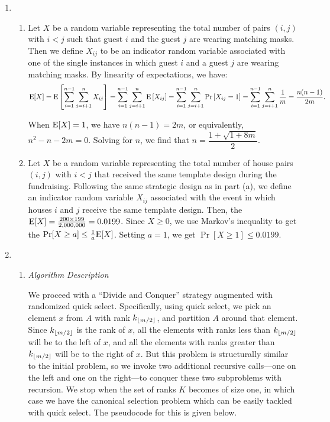 \documentclass[10pt, letterpaper]{article}
\begin{document}
\begin{enumerate}[label={\bfseries Q\arabic*.}]
  \item
    \begin{enumerate}
      \item
        Let $X$ be a random variable representing the total number of pairs $(i, j)$ with $i < j$ such
        that guest $i$ and the guest $j$ are wearing matching masks. Then we define $X_{ij}$ to be an
        indicator random variable associated with one of the single instances in which guest $i$ and a
        guest $j$ are wearing matching masks. By linearity of expectations, we have:
        \[
          \mathrm{E}[X] = \mathrm{E}\left[\displaystyle\sum_{i=1}^{n-1} \displaystyle\sum_{j=i+1}^{n} X_{ij}\right]
                = \displaystyle\sum_{i=1}^{n-1} \displaystyle\sum_{j=i+1}^{n} \mathrm{E}\left[X_{ij}\right]
                = \displaystyle\sum_{i=1}^{n-1} \displaystyle\sum_{j=i+1}^{n} \Pr\left[X_{ij} = 1\right]
                = \displaystyle\sum_{i=1}^{n-1} \displaystyle\sum_{j=i+1}^{n} \frac{1}{m} 
                = \frac{n(n-1)}{2m}.
       \]

        When $\mathrm{E}[X] = 1$, we have $n(n-1) = 2m$, or equivalently, $n^2 - n - 2m = 0$. Solving for
        $n$, we find that $n = \dfrac{1 + \sqrt{1+8m}}{2}$.

      \item
        Let $X$ be a random variable representing the total number of house pairs $(i,j)$ with $i < j$ that
        received the same template design during the fundraising. Following the same strategic design as in
        part (a), we define an indicator random variable $X_{ij}$ associated with the event in which houses
        $i$ and $j$ receive the same template design. Then, the $\mathrm{E}[X] = \frac{200 \times 199}{2,000,000} =
        0.0199$. Since $X \geq 0$, we use Markov's inequality to get the $\Pr[X \geq a] \leq \frac{1}
        {a}\mathrm{E}[X]$. Setting $a = 1$, we get $\Pr[X \geq 1] \leq 0.0199$.
    \end{enumerate}

  \item
    \begin{enumerate}
      \item
        {\itshape Algorithm Description} \\ \vspace{-4mm}

        We proceed with a ``Divide and Conquer'' strategy augmented with randomized quick select. Specifically,
        using quick select, we pick an element $x$ from $A$ with rank $k_{\lfloor m/2 \rfloor}$, and partition $A$
        around that element. Since $k_{\lfloor m/2 \rfloor}$ is the rank of $x$, all the elements with ranks less than
        $k_{\lfloor m/2 \rfloor}$ will be to the left of $x$, and all the elements with ranks greater than
        $k_{\lfloor m/2 \rfloor}$ will be to the right of $x$. But this problem is structurally similar to the
        initial problem, so we invoke two additional recursive calls---one on the left and one on the right---to
        conquer these two subproblems with recursion. We stop when the set of ranks $K$ becomes of size one, in
        which case we have the canonical selection problem which can be easily tackled with quick select. The
        pseudocode for this is given below.


\end{enumerate}
\end{enumerate}
\end{document}
